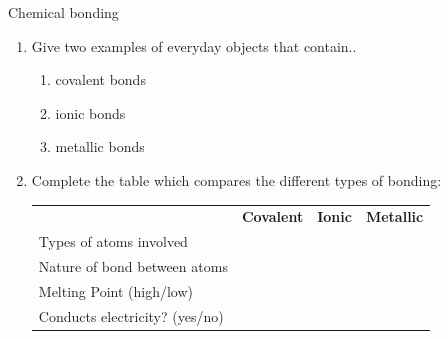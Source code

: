             \begin{exercises}{  Chemical bonding
        }
            \nopagebreak
        \label{m38694*id143111}\begin{enumerate}[noitemsep, label=\textbf{\arabic*}. ] 
            \label{m38694*uid86}\item Give two examples of everyday objects that contain..
\label{m38694*id143127}\begin{enumerate}[noitemsep, label=\textbf{\alph*}. ] 
            \label{m38694*uid87}\item covalent bonds
\label{m38694*uid88}\item ionic bonds
\label{m38694*uid89}\item metallic bonds
\end{enumerate}
                \label{m38694*uid90}\item Complete the table which compares the different types of bonding:
          \begin{table}[H]
        \begin{center}
      \label{m38694*id143180}
    \noindent
      \tablelasttail{}
      \begin{xtabular}[t]{|l|l|l|l|}\hline
         &
        \textbf{Covalent} &
        \textbf{Ionic} &
        \textbf{Metallic}%
     \tabularnewline{}
        Types of atoms involved &
         &
         &
     \tabularnewline{}
        Nature of bond between atoms &
         &
         &
     \tabularnewline{}
        Melting Point (high/low) &
         &
         &
     \tabularnewline{}
        Conducts electricity? (yes/no) &

\end{xtabular}
\end{center}
\end{table}
\end{enumerate}
\end{exercises}

